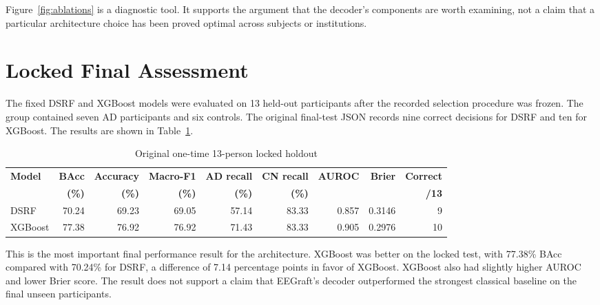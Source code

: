 
Figure~\ref{fig:ablations} is a diagnostic tool. It supports the argument that the decoder's components are worth examining, not a claim that a particular architecture choice has been proved optimal across subjects or institutions.

\section{Locked Final Assessment}
The fixed DSRF and XGBoost models were evaluated on 13 held-out participants after the recorded selection procedure was frozen. The group contained seven AD participants and six controls. The original final-test JSON records nine correct decisions for DSRF and ten for XGBoost. The results are shown in Table~\ref{tab:holdout}.

\begin{table}[htbp]\centering\scriptsize
\caption{Original one-time 13-person locked holdout}\label{tab:holdout}
\begin{tabular}{@{}lrrrrrrrr@{}}\toprule
\textbf{Model}&\textbf{BAcc}&\textbf{Accuracy}&\textbf{Macro-F1}&\textbf{AD recall}&\textbf{CN recall}&\textbf{AUROC}&\textbf{Brier}&\textbf{Correct}\\
&\textbf{(\%)}&\textbf{(\%)}&\textbf{(\%)}&\textbf{(\%)}&\textbf{(\%)}&&&\textbf{/13}\\\midrule
DSRF&70.24&69.23&69.05&57.14&83.33&0.857&0.3146&9\\
XGBoost&77.38&76.92&76.92&71.43&83.33&0.905&0.2976&10\\\bottomrule
\end{tabular}\end{table}

This is the most important final performance result for the architecture. XGBoost was better on the locked test, with 77.38\% BAcc compared with 70.24\% for DSRF, a difference of 7.14 percentage points in favor of XGBoost. XGBoost also had slightly higher AUROC and lower Brier score. The result does not support a claim that EEGraft's decoder outperformed the strongest classical baseline on the final unseen participants.

